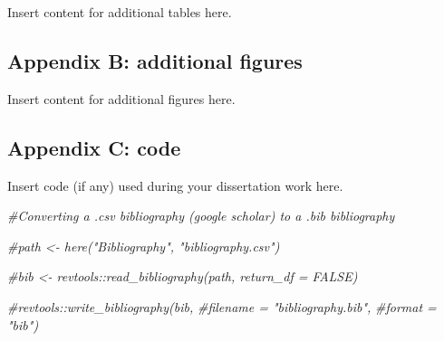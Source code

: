 \documentclass[
  12pt,
]{article}
\newenvironment{Shaded}{\begin{snugshade}}{\end{snugshade}}
\newcommand{\CommentTok}[1]{\textcolor[rgb]{0.56,0.35,0.01}{\textit{#1}}}
\begin{document}
Insert content for additional tables here.

\newpage

\hypertarget{appendix-b-additional-figures}{%
\subsection{Appendix B: additional
figures}\label{appendix-b-additional-figures}}

Insert content for additional figures here.

\newpage

\hypertarget{appendix-c-code}{%
\subsection{Appendix C: code}\label{appendix-c-code}}

Insert code (if any) used during your dissertation work here.

\begin{Shaded}
\begin{Highlighting}[]
\CommentTok{\#Converting a .csv bibliography (google scholar) to a .bib bibliography }

\CommentTok{\#path \textless{}{-} here("Bibliography", "bibliography.csv")}

\CommentTok{\#bib \textless{}{-} revtools::read\_bibliography(path, return\_df = FALSE)}

\CommentTok{\#revtools::write\_bibliography(bib,}
\CommentTok{\#filename = "bibliography.bib",}
\CommentTok{\#format = "bib")}
\end{Highlighting}
\end{Shaded}
\end{document}
